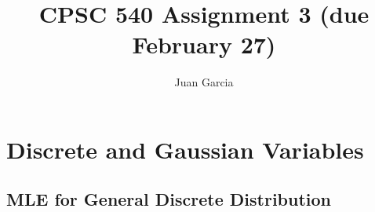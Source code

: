 \documentclass{article}
\begin{document}
\def\blu#1{{\color{blu}#1}}
\def\gre#1{{\color{gre}#1}}
\def\red#1{{\color{red}#1}}
\def\norm#1{\|#1\|}
\newcommand{\argmin}[1]{\mathop{\hbox{argmin}}_{#1}}
\newcommand{\argmax}[1]{\mathop{\hbox{argmax}}_{#1}}
\def\R{\mathbb{R}}
\newcommand{\fig}[2]{\texttt{[image: a3f/\#2]}}
\newcommand{\centerfig}[2]{\begin{center}\texttt{[image: a3f/\#2]}\end{center}}
\def\items#1{\begin{itemize}#1\end{itemize}}
\def\enum#1{\begin{enumerate}#1\end{enumerate}}
\def\argmax{\mathop{\rm arg\,max}}
\def\argmin{\mathop{\rm arg\,min}}
\def\half{\frac 1 2}
\newcommand{\code}[1]{}
\newcommand{\alignStar}[1]{\begin{align*}#1\end{align*}}
\newcommand{\mat}[1]{\begin{bmatrix}#1\end{bmatrix}}


\newcommand{\p}{\mathbb{P}}
\newcommand{\x}{\textbf{x}}
\newcommand{\yy}{\tilde{y}^{i}}
\newcommand{\xx}{\tilde{x}^{i}}
\newcommand{\kk}{1-\sum_{c\neq (k,k)}\theta_{c}}



\title{CPSC 540 Assignment 3 (due February 27)}
\author{Juan Garcia}
\date{}
\maketitle


\section{Discrete and Gaussian Variables}

\subsection{MLE for General Discrete Distribution}
\end{document}
